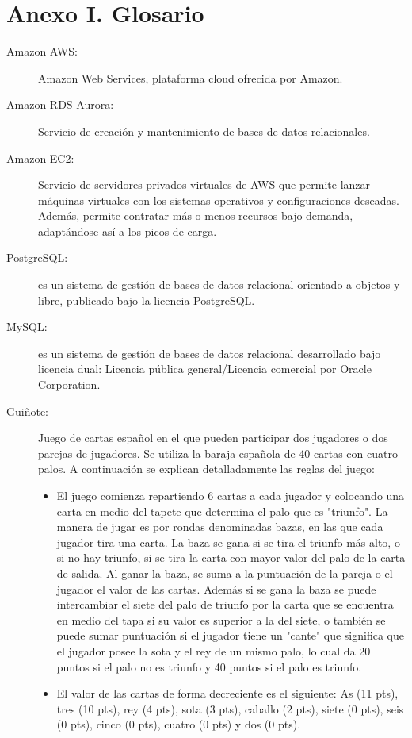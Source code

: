 \documentclass[]{article}
\begin{document}
\section*{Anexo I. Glosario}
\label{an1}
\begin{description}
\item[Amazon AWS:] Amazon Web Services, plataforma cloud ofrecida por Amazon. \cite{aws}
\item[Amazon RDS Aurora:] Servicio de creación y mantenimiento de bases de datos relacionales. \cite{aurora}
\item[Amazon EC2:] Servicio de servidores privados virtuales de AWS que permite lanzar máquinas virtuales con los sistemas operativos y configuraciones deseadas. Además, permite contratar más o menos recursos bajo demanda, adaptándose así a los picos de carga. \cite{ec2}
\item[PostgreSQL:] es un sistema de gestión de bases de datos relacional orientado a objetos y libre, publicado bajo la licencia PostgreSQL.
\item[MySQL:] es un sistema de gestión de bases de datos relacional desarrollado bajo licencia dual: Licencia pública general/Licencia comercial por Oracle Corporation.
\item[Guiñote:] Juego de cartas español en el que pueden participar dos jugadores o dos parejas de jugadores. Se utiliza la baraja española de 40 cartas con cuatro palos. A continuación se explican detalladamente las reglas del juego:
\begin{itemize}
\item{El juego comienza repartiendo 6 cartas a cada jugador y colocando una carta en medio del tapete que determina el palo que es "triunfo". La manera de jugar es por rondas denominadas bazas, en las que cada jugador tira una carta. La baza se gana si se tira el triunfo más alto, o si no hay triunfo, si se tira la carta con mayor valor del palo de la carta de salida. Al ganar la baza, se suma a la puntuación de la pareja o el jugador el valor de las cartas. Además si se gana la baza se puede intercambiar el siete del palo de triunfo por la carta que se encuentra en medio del tapa si su valor es superior a la del siete, o también se puede sumar puntuación si el jugador tiene un "cante" que significa que el jugador posee la sota y el rey de un mismo palo, lo cual da 20 puntos si el palo no es triunfo y 40 puntos si el palo es triunfo.}
\item{El valor de las cartas de forma decreciente es el siguiente: As (11 pts), tres (10 pts), rey (4 pts), sota (3 pts), caballo (2 pts), siete (0 pts), seis (0 pts), cinco (0 pts), cuatro (0 pts) y dos (0 pts).}

\end{itemize}
\end{description}
\end{document}
